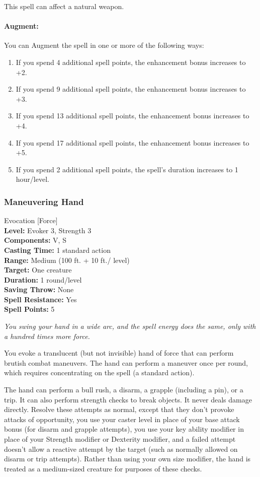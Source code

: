 This spell can affect a natural weapon.

\paragraph{Augment:} You can Augment the spell in one or more of the following ways:
\begin{enumerate}
 \item If you spend 4 additional spell points, the enhancement bonus increases to +2.
 \item If you spend 9 additional spell points, the enhancement bonus increases to +3.
 \item If you spend 13 additional spell points, the enhancement bonus increases to +4.
 \item If you spend 17 additional spell points, the enhancement bonus increases to +5.
 \item If you spend 2 additional spell points, the spell's duration increases to 1 hour/level.
\end{enumerate}
\subsubsection{Maneuvering Hand}
\label{Spell:ManeuveringHand}
Evocation [Force]
\\ \textbf{Level:} Evoker 3, Strength 3
\\ \textbf{Components:} V, S
\\ \textbf{Casting Time:} 1 standard action
\\ \textbf{Range:} Medium (100 ft. + 10 ft./ level)
\\ \textbf{Target:} One creature
\\ \textbf{Duration:} 1 round/level
\\ \textbf{Saving Throw:} None
\\ \textbf{Spell Resistance:} Yes
\\ \textbf{Spell Points:} 5

\emph{You swing your hand in a wide arc, and the spell energy does the same, only with a hundred times more force.}

You evoke a translucent (but not invisible) hand of force that can perform brutish combat maneuvers.
The hand can perform a maneuver once per round, which requires concentrating on the spell (a standard action). 

The hand can perform a bull rush, a disarm, a grapple (including a pin), or a trip. It can also perform strength checks to break objects. It never deals damage directly.
Resolve these attempts as normal, except that they don't provoke attacks of opportunity,
you use your caster level in place of your base attack bonus (for disarm and grapple attempts), you use your key ability modifier in place of your Strength modifier or Dexterity modifier, and a failed attempt doesn't allow a reactive attempt by the target (such as normally allowed on disarm or trip attempts).
Rather than using your own size modifier, the hand is treated as a medium-sized creature for purposes of these checks.

